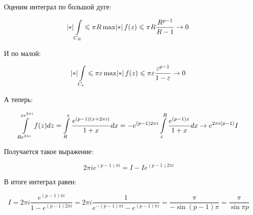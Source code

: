 \begin{example}
    Оценим интеграл по большой дуге:

    \[
        \abs{\int\limits_{C_R}}
        \le \pi R \max \abs{f(z)}
        \le \pi R \frac{R^{p-1}}{R-1} \to 0
    \]

    И по малой:

    \[
        \abs{\int\limits_{C_\ve}} \le \pi \ve
        \max \abs{f(z)} \le \pi \ve \frac{\ve^{p-1}}{1-\ve} \to 0
    \]

    А теперь:

    \[
        \int\limits_{Re^{2\pi i}}^{\varepsilon e^{2\pi i}} f(z)dz
        = \int\limits_R^\varepsilon \frac{e^{(p-1)(x+2\pi i)}}{1+x}dx
        = -e^{(p-1)2\pi i}
        \int\limits_\varepsilon^R \frac{e^{(p-1)x}}{1+x}dx
        \to e^{2\pi i(p-1)}I
    \]

    Получается такое выражение:

    \[
        2\pi i e^{(p-1)\pi i} = I - Ie^{(p-1)2\pi i}
    \]

    В итоге интеграл равен:

    \[
        I = 2\pi i \frac{e^{(p-1)\pi i}}{1-e^{(p-1)2\pi i}}
        = 2\pi i \frac{1}{e^{-(p-1)\pi i}-e^{(p-1)\pi i}}
        = \frac{\pi}{-\sin (p-1)\pi } = \frac{\pi}{\sin \pi p}
    \]

\end{example}

\newpage

